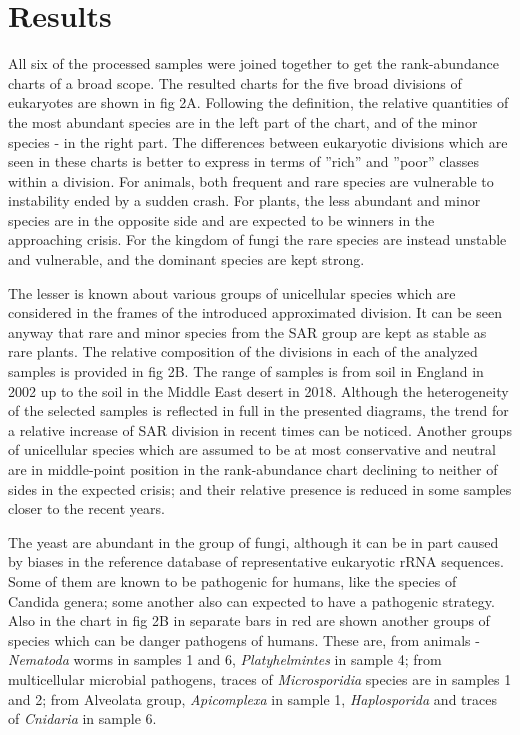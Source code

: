 \documentclass[a4paper]{article}
\begin{document}
\section*{Results} 


All six of the processed samples were joined together to get the rank-abundance charts of a broad scope. The resulted charts for the five broad divisions of eukaryotes are shown in fig 2A. Following the definition, the relative quantities of the most abundant species are in the left part of the chart, and of the minor species - in the right part. The differences between eukaryotic divisions which are seen in these charts is better to express in terms of ''rich'' and ''poor'' classes within a division. For animals, both frequent and rare species are vulnerable to instability ended by a sudden crash. For plants, the less abundant and minor species are in the opposite side and are expected to be winners in the approaching crisis. For the kingdom of fungi the rare species are instead unstable and vulnerable, and the dominant species are kept strong.   

The lesser is known about various groups of unicellular species which are considered in the frames of the introduced approximated division. It can be seen anyway that rare and minor species from the SAR group are kept as stable as rare plants. The relative composition of the divisions in each of the analyzed samples is provided in fig 2B. The range of samples is from soil in England in 2002 up to the soil in the Middle East desert in 2018. Although the heterogeneity of the selected samples is reflected in full in the presented diagrams, the trend for a relative increase of SAR division in recent times can be noticed. Another groups of unicellular species which are assumed to be at most conservative and neutral are in middle-point position in the rank-abundance chart declining to neither of sides in the expected crisis; and their relative presence is reduced in some samples closer to the recent years.

The yeast are abundant in the group of fungi, although it can be in part caused by biases in the reference database of representative eukaryotic rRNA sequences. Some of them are known to be pathogenic for humans, like the species of Candida genera; some another also can expected to have a pathogenic strategy. Also in the chart in fig 2B in separate bars in red are shown another groups of species which can be danger pathogens of humans. These are, from animals - \textit{Nematoda} worms in samples 1 and 6, \textit{Platyhelmintes} in sample 4; from multicellular microbial pathogens, traces of \textit{Microsporidia} species are in samples 1 and 2; from Alveolata group, \textit{Apicomplexa} in sample 1, \textit{Haplosporida} and traces of \textit{Cnidaria} in sample 6.
\end{document}

